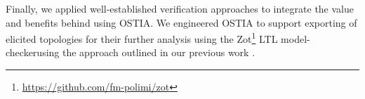 Finally, we applied well-established verification approaches to integrate the value and benefits behind using OSTIA. We engineered OSTIA to support exporting of elicited topologies for their further analysis using the Zot\footnote{\url{https://github.com/fm-polimi/zot}} LTL model-checkerusing the approach outlined in our previous work \cite{icsoft}.
